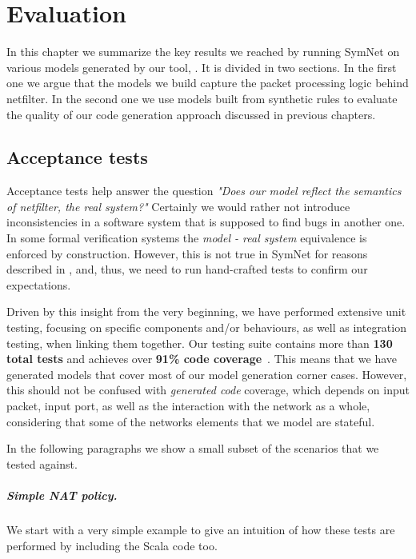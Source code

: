 \chapter{Evaluation}\label{chapter:eval}

In this chapter we summarize the key results we reached by running SymNet on
various models generated by our tool, \TOOL.  It is divided in two sections.
In the first one we argue that the models we build capture the packet
processing logic behind netfilter.  In the second one we use models built from
synthetic rules to evaluate the quality of our code generation approach
discussed in previous chapters.


\section{Acceptance tests}

Acceptance tests help answer the question \emph{"Does our model reflect the
semantics of netfilter, the real system?"}  Certainly we would rather not
introduce inconsistencies in a software system that is supposed to find bugs in
another one. In some formal verification systems the \emph{model - real system}
equivalence is enforced by construction.  However, this is not true in SymNet
for reasons described in , and, thus,
we need to run hand-crafted tests to confirm our expectations.

Driven by this insight from the very beginning, we have performed extensive
unit testing, focusing on specific components and/or behaviours, as well as
integration testing, when linking them together.  Our testing suite contains
more than \textbf{130 total tests} and achieves over \textbf{91\% code
coverage}~\cite{github-repo}.  This means that we have generated models that
cover most of our model generation corner cases.  However, this should not be
confused with \emph{generated code} coverage, which depends on input packet,
input port, as well as the interaction with the network as a whole, considering
that some of the networks elements that we model are stateful.

In the following paragraphs we show a small subset of the scenarios that we
tested against.

\paragraph{Simple NAT policy.}
We start with a very simple example to give an intuition of how these tests are
performed by including the Scala code too.

